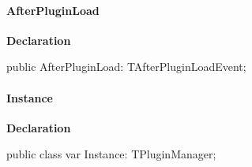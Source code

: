 \documentclass{report}
\begin{document}
\paragraph*{AfterPluginLoad}\hspace*{\fill}

\begin{list}{}{
\setlength{\itemindent}{0cm}
\setlength{\listparindent}{0cm}
\setlength{\leftmargin}{\evensidemargin}
\addtolength{\leftmargin}{\tmplength}
\settowidth{\labelsep}{X}
\addtolength{\leftmargin}{\labelsep}
\setlength{\labelwidth}{\tmplength}
}
\begin{flushleft}
\item[\textbf{Declaration}\hfill]
\begin{ttfamily}
public AfterPluginLoad: TAfterPluginLoadEvent;\end{ttfamily}


\end{flushleft}
\end{list}
\paragraph*{Instance}\hspace*{\fill}

\begin{list}{}{
\setlength{\itemindent}{0cm}
\setlength{\listparindent}{0cm}
\setlength{\leftmargin}{\evensidemargin}
\addtolength{\leftmargin}{\tmplength}
\settowidth{\labelsep}{X}
\addtolength{\leftmargin}{\labelsep}
\setlength{\labelwidth}{\tmplength}
}
\begin{flushleft}
\item[\textbf{Declaration}\hfill]
\begin{ttfamily}
public class var Instance: TPluginManager;\end{ttfamily}


\end{flushleft}
\end{list}
\end{document}
